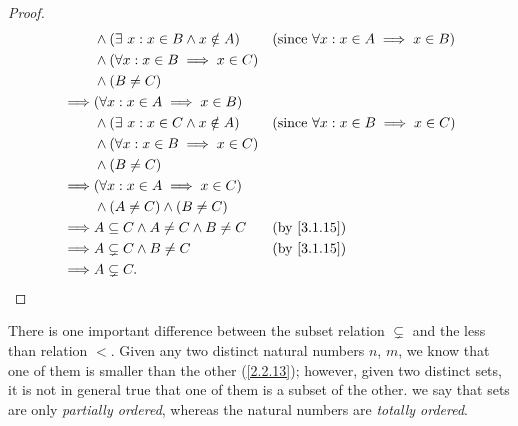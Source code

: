 \begin{proof}
\begin{align*}
             & \land (\exists\ x : x \in B \land x \notin A)                                   &  & \text{(since \(\forall x : x \in A \implies x \in B\))} \\
             & \land (\forall x : x \in B \implies x \in C)                                                                                                 \\
             & \land (B \neq C)                                                                                                                             \\
    \implies & (\forall x : x \in A \implies x \in B)                                                                                                       \\
             & \land (\exists\ x : x \in C \land x \notin A)                                   &  & \text{(since \(\forall x : x \in B \implies x \in C\))} \\
             & \land (\forall x : x \in B \implies x \in C)                                                                                                 \\
             & \land (B \neq C)                                                                                                                             \\
    \implies & (\forall x : x \in A \implies x \in C)                                                                                                       \\
             & \land (A \neq C) \land (B \neq C)                                                                                                            \\
    \implies & A \subseteq C \land A \neq C \land B \neq C                                     &  & \text{(by \cref{3.1.15})}                               \\
    \implies & A \subsetneq C \land B \neq C                                                   &  & \text{(by \cref{3.1.15})}                               \\
    \implies & A \subsetneq C.
  \end{align*}
\end{proof}

\setcounter{thm}{19}
\begin{rmk}\label{3.1.20}
  There is one important difference between the subset relation \(\subsetneq\) and the less than relation \(<\).
  Given any two distinct natural numbers \(n\), \(m\), we know that one of them is smaller than the other (\cref{2.2.13});
  however, given two distinct sets, it is not in general true that one of them is a subset of the other.
  we say that sets are only \emph{partially ordered}, whereas the natural numbers are \emph{totally ordered}.
\end{rmk}

